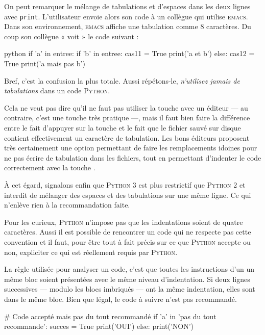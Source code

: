 On peut remarquer le mélange de tabulations et d'espaces dans les deux lignes avec \texttt{print}. L'utilisateur envoie alors son code à un collègue qui utilise \textsc{emacs}. Dans son environnement, \textsc{emacs} affiche une tabulation comme 8 caractères. Du coup son collègue « voit » le code suivant :

\begin{codebox}{python}
if 'a' in entree:
        if 'b' in entree:
                cas11 = True
            print('a et b')
        else:
                cas12 = True
            print('a mais pas b')
\end{codebox}

Bref, c'est la confusion la plus totale. Aussi répétons-le, \emph{n'utilisez jamais de tabulations } dans un code \textsc{Python}.

Cela ne veut pas dire qu'il ne faut pas utiliser la touche  avec un éditeur --- au contraire, c'est une touche très pratique ---, mais il faut bien faire la différence entre le fait d'appuyer sur la touche  et le fait que le fichier sauvé sur disque contient effectivement un caractère de tabulation. Les bons éditeurs proposent très certainement une option permettant de faire les remplacements idoines pour ne pas écrire de tabulation dans les fichiers, tout en permettant d'indenter le code correctement avec la touche .

À cet égard, signalons enfin que \textsc{Python} 3 est plus restrictif que \textsc{Python} 2 et interdit de mélanger des espaces et des tabulations sur une même ligne. Ce qui n'enlève rien à la recommandation faite.


Pour les curieux, \textsc{Python} n'impose pas que les indentations soient de quatre caractères. Aussi il est possible de rencontrer un code qui ne respecte pas cette convention et il faut, pour être tout à fait précis sur ce que \textsc{Python} accepte ou non, expliciter ce qui est réellement requis par \textsc{Python}.

La règle utilisée pour analyser un code, c'est que toutes les instructions d'un un même bloc soient présentées avec le même niveau d'indentation. Si deux lignes successives --- modulo les blocs imbriqués --- ont la même indentation, elles sont dans le même bloc.
Bien que légal, le code à suivre n'est pas recommandé.

\begin{idleconsole}
\begin{pyconsole}
# Code accepté mais pas du tout recommandé
if 'a' in 'pas du tout recommande':
  succes = True
  print('OUI')
else:
      print('NON')

\end{pyconsole}
\end{idleconsole}

